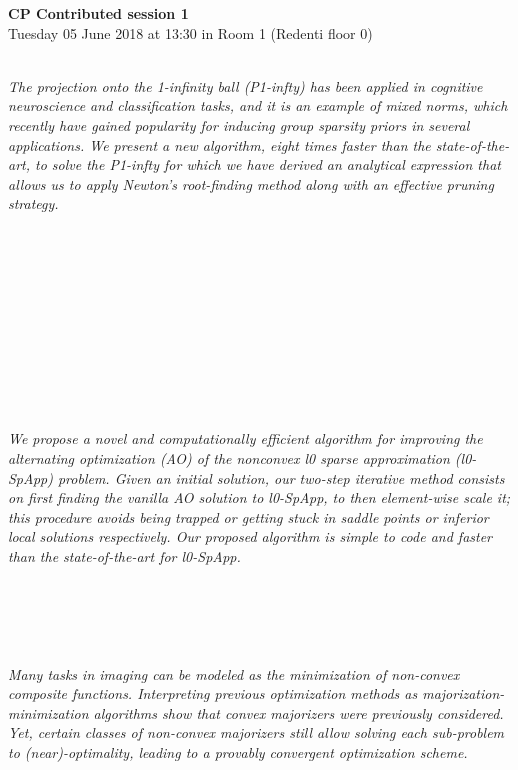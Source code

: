   \noindent\textbf{CP Contributed session 1}\\
    Tuesday 05 June 2018 at 13:30 in Room 1 (Redenti floor 0)  \\
  \textit{} \\
    
  \begin{multicols}{2}
    \textit{The projection onto the 1-infinity ball (P1-infty) has been applied in
cognitive neuroscience and classification tasks, and it is an example
of mixed norms, which recently have gained popularity for inducing
group sparsity priors in several applications. We present a new
algorithm, eight times faster than the state-of-the-art, to solve the
P1-infty for which we have derived an analytical expression that
allows us to apply Newton’s root-finding method along with an
effective pruning strategy.}\\
\\ 
      \\
      \\\\
      \\
      \\\\
      \\
      \\\\
\\
    \textit{We propose a novel and computationally efficient algorithm for improving the alternating optimization (AO) of the nonconvex l0 sparse approximation (l0-SpApp) problem. Given an initial solution, our two-step iterative method consists on first finding the vanilla AO solution to l0-SpApp, to then element-wise scale it; this procedure avoids being trapped or getting stuck in saddle points or inferior local solutions respectively. Our proposed algorithm is simple to code and faster than the state-of-the-art for l0-SpApp.}\\
\\ 
      \\
      \\\\
\\
    \textit{Many tasks in imaging can be modeled as the minimization of non-convex composite functions. Interpreting previous optimization methods as majorization-minimization algorithms show that convex majorizers were previously considered. Yet, certain classes of non-convex majorizers still allow solving each sub-problem to (near)-optimality, leading to a provably convergent optimization scheme.
}
\end{multicols}
